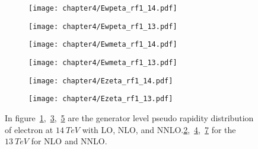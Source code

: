 \documentclass[a4paper,12pt]{report}
\numberwithin{equation}{section}
\begin{document}
\begin{figure}[H]
\centering
\begin{subfigure}{0.49\textwidth}
\texttt{[image: chapter4/Ewpeta\_rf1\_14.pdf]}
\vspace*{-8mm}
\caption{}
\label{eeta141}
\end{subfigure}
\begin{subfigure}{0.49\textwidth}
\texttt{[image: chapter4/Ewpeta\_rf1\_13.pdf]}
\vspace*{-8mm}
\caption{}
\label{eeta131}
\end{subfigure}
\begin{subfigure}{0.49\textwidth}
\texttt{[image: chapter4/Ewmeta\_rf1\_14.pdf]}
\vspace*{-8mm}
\caption{}
\label{eeta142}
\end{subfigure}
\begin{subfigure}{0.49\textwidth}
\texttt{[image: chapter4/Ewmeta\_rf1\_13.pdf]}
\vspace*{-8mm}
\caption{}
\label{eeta132}
\end{subfigure}
\begin{subfigure}{0.49\textwidth}
\texttt{[image: chapter4/Ezeta\_rf1\_14.pdf]}
\vspace*{-8mm}
\caption{}
\label{eeta143}
\end{subfigure}
\begin{subfigure}{0.49\textwidth}
\texttt{[image: chapter4/Ezeta\_rf1\_13.pdf]}
\vspace*{-8mm}
\caption{}
\label{eeta133}
\end{subfigure}
\caption{In figure~\ref{eeta141},~\ref{eeta142},~\ref{eeta143} are the generator level pseudo rapidity distribution of electron at $14~TeV$ with LO, NLO, and NNLO.\ref{eeta131},~\ref{eeta132},~\ref{eeta133} for the $13~TeV$ for NLO and NNLO.}  
\end{figure}
\end{document}
